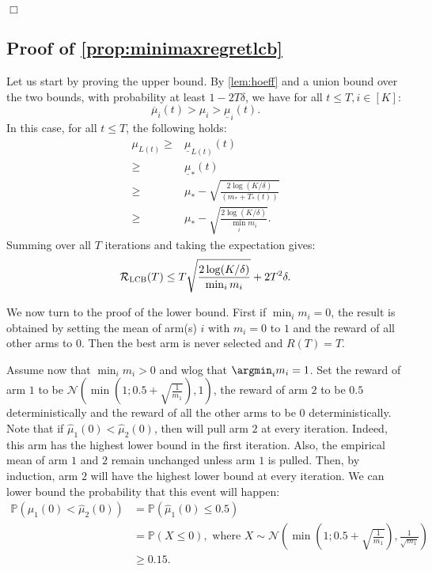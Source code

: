 \hfill \(\Box\)

\subsection{Proof of \cref{prop:minimaxregretlcb}}

Let us start by proving the upper bound. By \cref{lem:hoeff} and a union bound over the two bounds, with probability at least $1-2T\delta$, we have for all $t\leq T, i \in [K]$:
\[
\overline{\mu}_i(t)>\mu_i>\underline{\mu}_i(t).
\]
In this case, for all $t\leq T$, the following holds:
\begin{align*}
 \mu_{L(t)}\geq & \underline{\mu}_{L(t)}(t)\\
 \geq& \underline{\mu}_{*}(t)\\
 \geq& \mu_*-\sqrt{\frac{2\log(K/\delta)}{(m_*+T_*(t))}}\\
 \geq& \mu_*-\sqrt{\frac{2\log(K/\delta)}{\min_i m_i}}.
\end{align*}
Summing over all $T$ iterations and taking the expectation gives:
\[
 \mathcal{R}_\textsc{LCB}(T) \leq T\sqrt{\frac{2\log(K/\delta)}{\min_i m_i}}+ 2T^2\delta.
\]

We now turn to the proof of the lower bound. First if $\min_i m_i =0$, the result is obtained by setting the mean of arm(s) $i$ with $m_i=0$ to $1$ and the reward of all other arms to $0$. Then the best arm is never selected and   $R(T)=T$.

Assume now that $\min_i m_i >0$ and  wlog that $\argmin_i m_i=1$. Set the reward of arm $1$ to be $\mathcal{N}\left(\min\left(1;0.5+\sqrt{\frac{1}{m_1}}\right),1\right)$, the reward of arm $2$ to be $0.5$ deterministically and the reward of all the other arms to be $0$ deterministically. Note that if $\hat{\mu}_1(0) < \hat{\mu}_2(0)$, then \alglcb will pull arm $2$ at every iteration. Indeed, this arm has the highest lower bound in the first iteration. Also, the empirical mean of arm $1$ and $2$ remain unchanged unless arm $1$ is pulled. Then, by induction, arm $2$ will have the highest lower bound at every iteration. We can lower bound the probability that this event will happen:
\begin{align*}
    \mathbb{P}(\hat{\mu}_1(0) < \hat{\mu}_2(0)) &= \mathbb{P}(\hat{\mu}_1(0) \leq 0.5) \\
    &= \mathbb{P}(X\leq 0), \text{ where } X\sim \mathcal{N}\left(\min\left(1;0.5+\sqrt{\frac{1}{m_1}}\right),\frac{1}{\sqrt{m_1}}\right)\\
    &\geq 0.15.
\end{align*}

